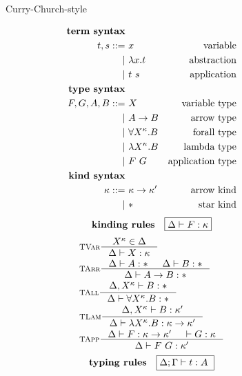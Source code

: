 \begin{figure}
\begin{singlespace}
\begin{minipage}{.46\textwidth}
	\begin{center}Curry-Church-style\end{center}
\def\baselinestretch{0}
\small
\begin{align*}
\textbf{term syntax} \\
t,s ::= &~ x           & \text{variable}    \\
      | &~ \lambda x    . t & \text{abstraction} \\
      | &~ t ~ s       & \text{application} \\
\textbf{type syntax} \\
F,G,A,B ::= &~ X                  & \text{variable type}    \\
          | &~ A -> B             & \text{arrow type}       \\   
          | &~ \forall X^\kappa.B & \text{forall type}      \\
          | &~ \lambda X^\kappa.B      & \text{lambda type}      \\
          | &~ F ~ G              & \text{application type} \\
\textbf{kind syntax} \\
\kappa ::= &~ \kappa -> \kappa' & \text{arrow kind} \\
         | &~ *                 & \text{star kind}   \\
\end{align*}
\[ \textbf{kinding rules} \quad \framebox{$ \Delta |- F:\kappa $} \]\vspace*{-1em}
\begin{align*}
& \inference[\sc TVar]{X^\kappa \in \Delta}{\Delta |- X:\kappa} \\
& \inference[\sc TArr]{\Delta |- A:* & \Delta |- B:*}{\Delta |- A -> B:*} \\
& \inference[\sc TAll]{\Delta,X^\kappa |- B:*}{\Delta |- \forall X^\kappa.B:*} \\
& \inference[\sc TLam]{\Delta,X^\kappa |- B:\kappa'}
		      {\Delta |- \l X^\kappa.B:\kappa -> \kappa'} \\
& \inference[\sc TApp]{\Delta |- F : \kappa -> \kappa' & |- G : \kappa}
		      {\Delta |- F ~ G : \kappa'} \\
\end{align*}
\[ \textbf{typing rules} \quad \framebox{$ \Delta;\Gamma |- t : A $ } \]
\vspace*{-1em}

\end{minipage}
\end{singlespace}
\end{figure}
